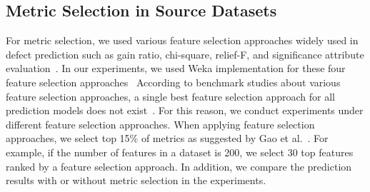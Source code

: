 %

\subsection{Metric Selection in Source Datasets}\label{sect:fss}
\label{sec:metricselection}
For metric selection, we used various feature selection
approaches widely used in defect prediction such as gain ratio, chi-square,
relief-F, and significance attribute evaluation~\cite{Gao11,Shivaji13}. In our experiments, we used Weka implementation for these four feature selection approaches~\cite{Weka}
According to benchmark studies about various feature selection approaches, a
single best feature selection approach for all prediction models does not
exist~\cite{Catal09,Hall03,Liu02}. For this reason, we conduct experiments
under different feature selection approaches. When applying feature selection
approaches, we select top 15\% of metrics as suggested by Gao et
al.~\cite{Gao11}. For example, if the number of features in a dataset is 200, we select 30 top features ranked by a feature selection approach. In addition, we compare the prediction results with or without
metric selection in the experiments.





